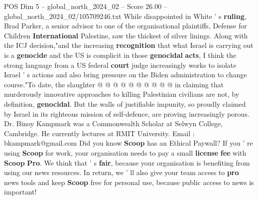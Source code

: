 \begin{textsample}{POS Dim 5 – global\_north\_2024\_02 – Score 26.00 – global\_north\_2024\_02/105709246.txt}
While disappointed in White ' s \textbf{ruling}, Brad Parker, a senior advisor to one of the organisational plaintiffs, Defense for Children \textbf{International} Palestine, saw the thickest of silver linings.
Along with the ICJ decision,"and the increasing \textbf{recognition} that what Israel is carrying out is a \textbf{genocide} and the US is complicit in those \textbf{genocidal} \textbf{acts}, I think the strong language from a US federal \textbf{court} judge increasingly works to isolate Israel ' s actions and also bring pressure on the Biden administration to change course."To date, the slaughter @ @ @ @ @ @ @ @ @ @ in claiming that murderously innovative approaches to killing Palestinian civilians are not, by definition, \textbf{genocidal}.
But the walls of justifiable impunity, so proudly claimed by Israel in its righteous mission of self-defence, are proving increasingly porous.
Dr.
Binoy Kampmark was a Commonwealth Scholar at Selwyn College, Cambridge.
He currently lectures at RMIT University.
Email : bkampmark@gmail.com Did you know \textbf{Scoop} has an Ethical Paywall?
If you ' re using \textbf{Scoop} for work, your organisation needs to pay a small \textbf{license} \textbf{fee} with \textbf{Scoop} \textbf{Pro}.
We think that ' s \textbf{fair}, because your organisation is benefiting from using our news resources.
In return, we ' ll also give your team access to \textbf{pro} news tools and keep \textbf{Scoop} free for personal use, because public access to news is important!

\end{textsample}
